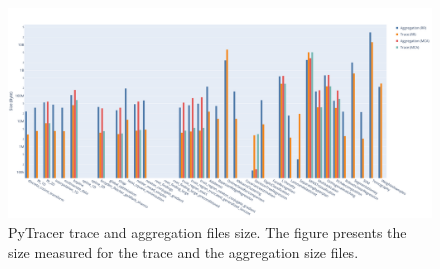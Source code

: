\documentclass[11pt]{article}
\newcommand{\pytracer}[0]{PyTracer\xspace}
\begin{document}
\begin{figure}
    \centering
    \includegraphics[width=\linewidth]{figure/parsing.pdf}
    \caption{\pytracer trace and aggregation files size.
    The figure presents the size measured for the trace and the aggregation size files.}
    \label{fig:performance_parsing_size}
\end{figure}
\end{document}
